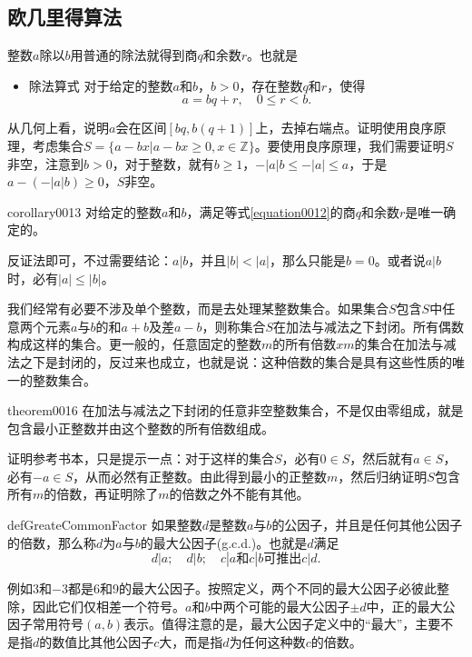 \subsection{欧几里得算法}
整数$a$除以$b$用普通的除法就得到商$q$和余数$r$。也就是
\begin{itemize}
\item \textcolor{main}{除法算式} 对于给定的整数$a$和$b$，$b>0$，存在整数$q$和$r$，使得
\begin{equation}\label{equation0012}
a = bq + r, \quad 0 \le r < b.
\end{equation}
\end{itemize}

从几何上看，说明$a$会在区间$[bq, b(q+1)]$上，去掉右端点。证明使用良序原理，考虑集合$S = \{a-bx|a-bx \ge 0, x \in \mathbb{Z}\}$。要使用良序原理，我们需要证明$S$非空，注意到$b>0$，对于整数，就有$b \ge 1$，$-|a|b \le -|a| \le a$，于是$a - (-|a|b) \ge 0$，$S$非空。

\begin{corollary}{}{corollary0013}
对给定的整数$a$和$b$，满足等式\ref{equation0012}的商$q$和余数$r$是唯一确定的。
\end{corollary}

反证法即可，不过需要结论：$a|b$，并且$|b| < |a|$，那么只能是$b = 0$。或者说$a|b$时，必有$|a| \le |b|$。

我们经常有必要不涉及单个整数，而是去处理某整数集合。如果集合$S$包含$S$中任意两个元素$a$与$b$的和$a+b$及差$a-b$，则称集合$S$在加法与减法之下封闭。所有偶数构成这样的集合。更一般的，任意固定的整数$m$的所有倍数$xm$的集合在加法与减法之下是封闭的，反过来也成立，也就是说：这种倍数的集合是具有这些性质的唯一的整数集合。
\begin{theorem}{}{theorem0016}
在加法与减法之下封闭的任意非空整数集合，不是仅由零组成，就是包含最小正整数并由这个整数的所有倍数组成。
\end{theorem}

证明参考书本，只是提示一点：对于这样的集合$S$，必有$0 \in S$，然后就有$a \in S$，必有$-a \in S$，从而必然有正整数。由此得到最小的正整数$m$，然后归纳证明$S$包含所有$m$的倍数，再证明除了$m$的倍数之外不能有其他。

\begin{definition}{}{defGreateCommonFactor}
如果整数$d$是整数$a$与$b$的公因子，并且是任何其他公因子的倍数，那么称$d$为$a$与$b$的最大公因子(g.c.d.)。也就是$d$满足
\[
d|a; \quad{}d|b;\quad{} c|a\text{和}c|b \text{可推出}c|d.
\]
\end{definition}

例如$3$和$-3$都是6和9的最大公因子。按照定义，两个不同的最大公因子必彼此整除，因此它们仅相差一个符号。$a$和$b$中两个可能的最大公因子$\pm{}d$中，正的最大公因子常用符号$(a, b)$表示。值得注意的是，最大公因子定义中的“最大”，主要不是指$d$的数值比其他公因子$c$大，而是指$d$为任何这种数$c$的倍数。

